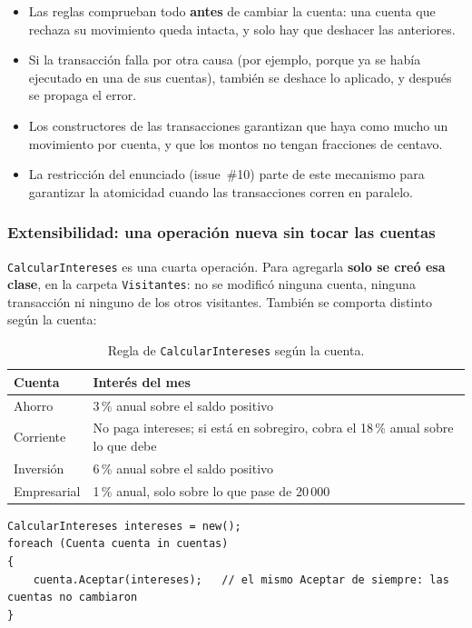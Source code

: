 \begin{itemize}
  \item Las reglas comprueban todo \textbf{antes} de cambiar la cuenta: una cuenta que
        rechaza su movimiento queda intacta, y solo hay que deshacer las anteriores.
  \item Si la transacción falla por otra causa (por ejemplo, porque ya se había ejecutado en
        una de sus cuentas), también se deshace lo aplicado, y después se propaga el error.
  \item Los constructores de las transacciones garantizan que haya como mucho un movimiento
        por cuenta, y que los montos no tengan fracciones de centavo.
  \item La restricción del enunciado (issue~\#10) parte de este mecanismo para garantizar la
        atomicidad cuando las transacciones corren en paralelo.
\end{itemize}

\subsubsection{Extensibilidad: una operación nueva sin tocar las cuentas}

\texttt{CalcularIntereses} es una cuarta operación. Para agregarla \textbf{solo se creó esa
clase}, en la carpeta \texttt{Visitantes}: no se modificó ninguna cuenta, ninguna
transacción ni ninguno de los otros visitantes. También se comporta distinto según la cuenta:

\begin{table}[H]
\centering
\small
\begin{tabular}{ll}
\toprule
\textbf{Cuenta} & \textbf{Interés del mes} \\
\midrule
Ahorro & 3\,\% anual sobre el saldo positivo \\
Corriente & No paga intereses; si está en sobregiro, cobra el 18\,\% anual sobre lo que debe \\
Inversión & 6\,\% anual sobre el saldo positivo \\
Empresarial & 1\,\% anual, solo sobre lo que pase de 20\,000 \\
\bottomrule
\end{tabular}
\caption{Regla de \texttt{CalcularIntereses} según la cuenta.}
\end{table}

\begin{lstlisting}[basicstyle=\ttfamily\footnotesize, columns=fullflexible, keepspaces=true]
CalcularIntereses intereses = new();
foreach (Cuenta cuenta in cuentas)
{
    cuenta.Aceptar(intereses);   // el mismo Aceptar de siempre: las cuentas no cambiaron
}
\end{lstlisting}

